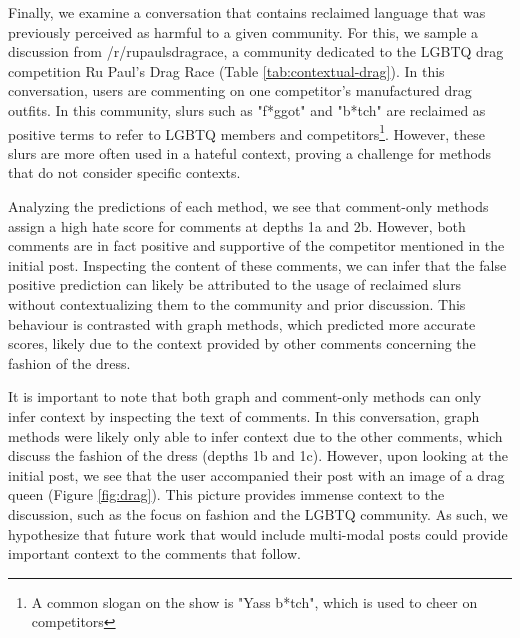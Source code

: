 \documentclass[letterpaper]{article} %
\begin{document}
Finally, we examine a conversation that contains reclaimed language that was previously perceived as harmful to a given community. For this, we sample a discussion from /r/rupaulsdragrace, a community dedicated to the LGBTQ drag competition Ru Paul's Drag Race (Table \ref{tab:contextual-drag}). In this conversation, users are commenting on one competitor's manufactured drag outfits. In this community, slurs such as "f*ggot" and "b*tch" are reclaimed as positive terms to refer to LGBTQ members and competitors\footnote{A common slogan on the show is "Yass b*tch", which is used to cheer on competitors}. However, these slurs are more often used in a hateful context, proving a challenge for methods that do not consider specific contexts.

Analyzing the predictions of each method, we see that comment-only methods assign a high hate score for comments at depths 1a and 2b. However, both comments are in fact positive and supportive of the competitor mentioned in the initial post. Inspecting the content of these comments, we can infer that the false positive prediction can likely be attributed to the usage of reclaimed slurs without contextualizing them to the community and prior discussion. This behaviour is contrasted with graph methods, which predicted more accurate scores, likely due to the context provided by other comments concerning the fashion of the dress.

It is important to note that both graph and comment-only methods can only infer context by inspecting the text of comments. In this conversation, graph methods were likely only able to infer context due to the other comments, which discuss the fashion of the dress (depths 1b and 1c).  However, upon looking at the initial post, we see that the user accompanied their post with an image of a drag queen (Figure \ref{fig:drag}). This picture provides immense context to the discussion, such as the focus on fashion and the LGBTQ community. As such, we hypothesize that future work that would include multi-modal posts could provide important context to the comments that follow.
\end{document}
